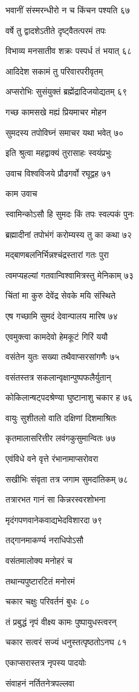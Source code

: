 भवानीं संस्मरन्धीरो न च किंचन पश्यति ६७

वर्षे तु द्वादशेऽतीते दृष्ट्वैतत्परमं तपः

विभाव्य मनसातीव शक्रः पस्पर्ध तं भयात् ६८

आदिदेश सकामं तु परिवारपरीवृतम्

अप्सरोभिः सुसंयुक्तं ब्रह्मेंद्रादिजयोद्यतम् ६९

गच्छ कामसखे मह्यं प्रियमाचर मोहन

सुमदस्य तपोविघ्नं समाचर यथा भवेत् ७०

इति श्रुत्वा महद्वाक्यं तुरासाहः स्वयंप्रभुः

उवाच विश्वविजये प्रौढगर्वो रघूद्वह ७१

काम उवाच

स्वामिन्कोऽसौ हि सुमदः किं तपः स्वल्पकं पुनः

ब्रह्मादीनां तपोभंगं करोम्यस्य तु का कथा ७२

मद्बाणबलनिर्भिन्नश्चंद्रस्तारां गतः पुरा

त्वमप्यहल्यां गतवान्विश्वामित्रस्तु मेनिकाम् ७३

चिंतां मा कुरु देवेंद्र सेवके मयि संस्थिते

एष गच्छामि सुमदं देवान्पालय मारिष ७४

एवमुक्त्वा कामदेवो हेमकूटं गिरिं ययौ

वसंतेन युतः सख्या तथैवाप्सरसांगणैः ७५

वसंतस्तत्र सकलान्वृक्षान्पुष्पफलैर्युतान्

कोकिलान्षट्पदश्रेण्या घुष्टानाशु चकार ह ७६

वायुः सुशीतलो वाति दक्षिणां दिशमाश्रितः

कृतमालासरित्तीर लवंगकुसुमान्वितः ७७

एवंविधे वने वृत्ते रंभानामाप्सरोवरा

सखीभिः संवृता तत्र जगाम सुमदांतिकम् ७८

तत्रारभत गानं सा किन्नरस्वरशोभना

मृदंगपणवानेकवाद्यभेदविशारदा ७९

तद्गानमाकर्ण्य नराधिपोऽसौ

वसंतमालोक्य मनोहरं च

तथान्यपुष्टारटितं मनोरमं

चकार चक्षुः परिवर्तनं बुधः ८०

तं प्रबुद्धं नृपं वीक्ष्य कामः पुष्पायुधस्त्वरन्

चकार सत्वरं सज्यं धनुस्तत्पृष्ठतोऽनघ ८१

एकाप्सरास्तत्र नृपस्य पादयोः

संवाहनं नर्तितनेत्रपल्लवा

